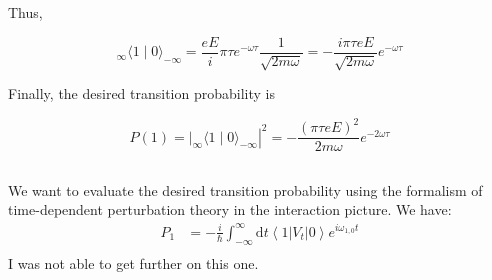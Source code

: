 \documentclass[12pt]{article}
\begin{document}
Thus,

$$
{ }_{\infty}\langle 1 \mid 0\rangle_{-\infty}=\frac{e E}{i} \pi \tau e^{-\omega \tau} \frac{1}{\sqrt{2 m \omega}}=-\frac{i \pi \tau e E}{\sqrt{2 m \omega}} e^{-\omega \tau}
$$

Finally, the desired transition probability is

$$
P(1)=\left.\left.\right|_{\infty}\langle 1 \mid 0\rangle_{-\infty}\right|^{2}=-\frac{(\pi \tau e E)^{2}}{2 m \omega} e^{-2 \omega \tau}
$$
\subsection{}
We want to evaluate the desired transition probability using the formalism of time-dependent perturbation theory in the interaction picture. We have:
\begin{equation}
  \begin{aligned}
    P_{1} &= -\frac{i}{\hbar} \int_{-\infty}^{\infty} \mathrm{d} t\left\langle 1\left|V_{t}\right| 0\right\rangle e^{i \omega_{1, 0} t} \\
\end{aligned}
\end{equation}
I was not able to get further on this one.
\end{document}
